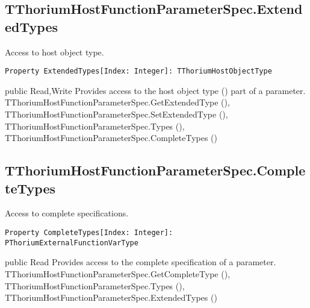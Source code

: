 \subsection{TThoriumHostFunctionParameterSpec.ExtendedTypes}
\label{thoriumcorepkg:thorium:tthoriumhostfunctionparameterspec:extendedtypes}
\begin{FPCList}
\Synopsis
Access to host object type.\Declaration 

\begin{verbatim}
Property ExtendedTypes[Index: Integer]: TThoriumHostObjectType
\end{verbatim}
\Visibility
public
\Access
Read,Write
\Description
Provides access to the host object type (\pageref{thoriumcorepkg:thorium:tthoriumhostobjecttype}) part of a parameter.\SeeAlso
TThoriumHostFunctionParameterSpec.GetExtendedType (\pageref{thoriumcorepkg:thorium:tthoriumhostfunctionparameterspec:getextendedtype}),
TThoriumHostFunctionParameterSpec.SetExtendedType (\pageref{thoriumcorepkg:thorium:tthoriumhostfunctionparameterspec:setextendedtype}),
TThoriumHostFunctionParameterSpec.Types (\pageref{thoriumcorepkg:thorium:tthoriumhostfunctionparameterspec:types}),
TThoriumHostFunctionParameterSpec.CompleteTypes (\pageref{thoriumcorepkg:thorium:tthoriumhostfunctionparameterspec:completetypes})\end{FPCList}
\subsection{TThoriumHostFunctionParameterSpec.CompleteTypes}
\label{thoriumcorepkg:thorium:tthoriumhostfunctionparameterspec:completetypes}
\begin{FPCList}
\Synopsis
Access to complete specifications.\Declaration 

\begin{verbatim}
Property CompleteTypes[Index: Integer]: PThoriumExternalFunctionVarType
\end{verbatim}
\Visibility
public
\Access
Read
\Description
Provides access to the complete specification of a parameter.\SeeAlso
TThoriumHostFunctionParameterSpec.GetCompleteType (\pageref{thoriumcorepkg:thorium:tthoriumhostfunctionparameterspec:getcompletetype}),
TThoriumHostFunctionParameterSpec.Types (\pageref{thoriumcorepkg:thorium:tthoriumhostfunctionparameterspec:types}),
TThoriumHostFunctionParameterSpec.ExtendedTypes (\pageref{thoriumcorepkg:thorium:tthoriumhostfunctionparameterspec:extendedtypes})\end{FPCList}

